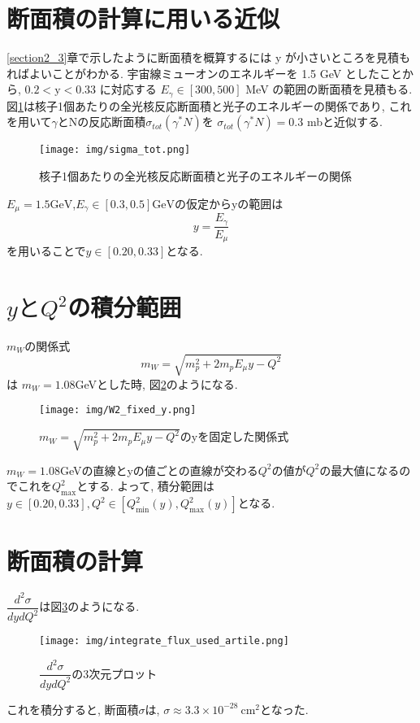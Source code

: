 \section{断面積の計算に用いる近似}
\ref{section2_3}章で示したように断面積を概算するには y が小さいところを見積もればよいことがわかる.
宇宙線ミューオンのエネルギーを 1.5 GeV としたことから,
$0.2 < \mathrm{y} < 0.33$ に対応する $E_\gamma \in [300, 500]$ MeV の範囲の断面積を見積もる.
図\ref{fig:sigma4}は核子1個あたりの全光核反応断面積と光子のエネルギーの関係であり, これを用いて$\gamma$とNの反応断面積$\sigma_{tot}(\gamma^* N)$を
$\sigma_{tot}(\gamma^* N) = 0.3$ mbと近似する.
\begin{figure}[H]
    \centering
    \texttt{[image: img/sigma\_tot.png]}
    \caption{核子1個あたりの全光核反応断面積と光子のエネルギーの関係}
    \label{fig:sigma4}
\end{figure}
$E_\mu = 1.5 \mathrm{GeV}$,$E_\gamma \in [0.3, 0.5] \mathrm{GeV}$の仮定からyの範囲は
\begin{equation}
    y = \dfrac{E_\gamma}{E_\mu}
\end{equation}
を用いることで$y \in [0.20, 0.33]$となる.

\section{\texorpdfstring{$yとQ^2$}{LG}の積分範囲}
$m_W$の関係式
\begin{equation}
    m_W = \sqrt{m_p^2 + 2m_pE_\mu y - Q^2}
\end{equation}
は
$m_W = 1.08$GeVとした時, 図\ref{fig:sigma5}のようになる.
\begin{figure}[H]
    \centering
    \texttt{[image: img/W2\_fixed\_y.png]}
    \caption{$m_W = \sqrt{m_p^2 + 2m_pE_\mu y - Q^2}$のyを固定した関係式}
    \label{fig:sigma5}
\end{figure}
$m_W = 1.08$GeVの直線とyの値ごとの直線が交わる$Q^2$の値が$Q^2$の最大値になるのでこれを$Q^2_{\mathrm{max}}$とする.
よって, 積分範囲は$y \in [0.20, 0.33], Q^2 \in [Q^2_{\mathrm{min}}(y), Q^2_{\mathrm{max}}(y)]$となる.

\section{断面積の計算}
$\dfrac{d^2\sigma}{dydQ^2}$は図\ref{fig:sigma6}のようになる.
\begin{figure}[H]
    \centering
    \texttt{[image: img/integrate\_flux\_used\_artile.png]}
    \caption{$\dfrac{d^2\sigma}{dydQ^2}$の3次元プロット}
    \label{fig:sigma6}
\end{figure}
これを積分すると, 断面積$\sigma$は, $\sigma \approx 3.3 \times 10^{-28} \ \mathrm{cm^2}$となった.


